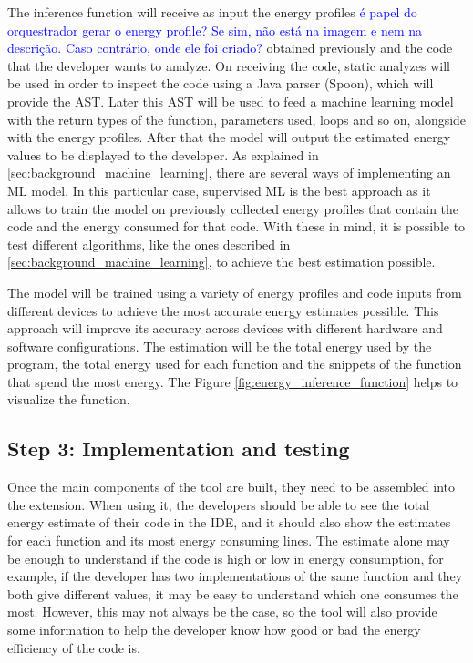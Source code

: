 \documentclass[sigplan]{acmart}
\newcommand{\wnote}[1]{\textcolor{blue}{#1}}
\begin{document}
The inference function will receive as input the energy profiles \wnote{é papel do orquestrador gerar o energy profile? Se sim, não está na imagem e nem na descrição. Caso contrário, onde ele foi criado?} obtained previously and the code that the developer wants to analyze. On receiving the code, static analyzes will be used in order to inspect the code using a Java parser (Spoon), which will provide the AST. Later this AST will be used to feed a machine learning model with the return types of the function, parameters used, loops and so on, alongside with the energy profiles. After that the model will output the estimated energy values to be displayed to the developer.
As explained in \ref{sec:background_machine_learning}, there are several ways of implementing an ML model. In this particular case, supervised ML is the best approach as it allows to train the model on previously collected energy profiles that contain the code and the energy consumed for that code. With these in mind, it is possible to test different algorithms, like the ones described in \ref{sec:background_machine_learning}, to achieve the best estimation possible.


The model will be trained using a variety of energy profiles and code inputs from different devices to achieve the most accurate energy estimates possible. This approach will improve its accuracy across devices with different hardware and software configurations.
The estimation will be the total energy used by the program, the total energy used for each function and the snippets of the function that spend the most energy.
The Figure \ref{fig:energy_inference_function} helps to visualize the function.

\subsection{Step 3: Implementation and testing} \label{sec:work_step3_implementation_and_testing}

Once the main components of the tool are built, they need to be assembled into the extension. When using it, the developers should be able to see the total energy estimate of their code in the IDE, and it should also show the estimates for each function and its most energy consuming lines.
The estimate alone may be enough to understand if the code is high or low in energy consumption, for example, if the developer has two implementations of the same function and they both give different values, it may be easy to understand which one consumes the most. However, this may not always be the case, so the tool will also provide some information to help the developer know how good or bad the energy efficiency of the code is.
\end{document}
